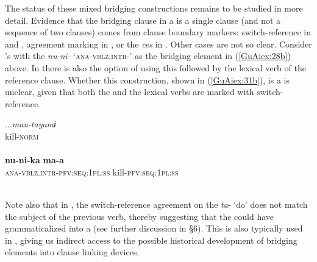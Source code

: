 \documentclass[output=paper]{LSP/langsci}
\begin{document}
The status of these mixed bridging constructions remains to be studied in more detail. Evidence that the bridging clause in a  is a single clause (and not a sequence of two clauses) comes from clause boundary markers: switch-reference in  and , agreement marking in , or the  \textit{ces}  in . Other cases are not so clear. Consider ’s  with the  \textit{nu-ni-} `\textsc{ana-vblz.intr-}' as the bridging element in (\ref{GuAiex:28b}) above. In  there is also the option of using this  followed by the lexical verb of the reference clause. Whether this construction, shown in (\ref{GuAiex:31b}), is a  is unclear, given that both the  and the lexical verbs are marked with switch-reference. 

\begin{exe}
\ex \label{GuAiex:31ac}
\begin{xlist}
\ex \label{GuAiex:31a}
\gll ...\textit{mau-tayamɨ}\\
 kill-\textsc{norm}\\
\glt {} \\
\ex \label{GuAiex:31b}
\gll  \textbf{nu-ni-ka} \textbf{ma-a}\\
\textsc{ana-vblz.intr-pfv:seq:1pl:ss}   kill-\textsc{pfv:seq:1pl:ss}\\
\glt {}\\
\ex \label{GuAiex:31c}
\glt {}
\end{xlist}
\end{exe} 

Note also that in , the switch-reference agreement on the  \textit{ta}- `do' does not match the subject of the previous verb, thereby suggesting that the  could have grammaticalized into a  (see further discussion in §6). This  is also typically used in , giving us indirect access to the possible historical development of bridging elements into clause linking devices.
\end{document}
